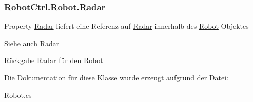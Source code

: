 \hypertarget{class_robot_ctrl_1_1_robot_adcc563b2531e72dcdfb9af5cafda1cbc}{
\subsubsection[{Radar}]{ RobotCtrl.Robot.Radar}}
\label{class_robot_ctrl_1_1_robot_adcc563b2531e72dcdfb9af5cafda1cbc}
Property \hyperlink{class_robot_ctrl_1_1_radar}{Radar} liefert eine Referenz auf \hyperlink{class_robot_ctrl_1_1_radar}{Radar} innerhalb des \hyperlink{class_robot_ctrl_1_1_robot}{Robot} Objektes \begin{DoxySeeAlso}{Siehe auch}
\hyperlink{class_robot_ctrl_1_1_radar}{Radar}
\end{DoxySeeAlso}
\begin{DoxyReturn}{Rückgabe}
\hyperlink{class_robot_ctrl_1_1_radar}{Radar} f\"{u}r den \hyperlink{class_robot_ctrl_1_1_robot}{Robot} 
\end{DoxyReturn}


Die Dokumentation für diese Klasse wurde erzeugt aufgrund der Datei:\begin{DoxyCompactItemize}
\item 
Robot.cs\end{DoxyCompactItemize}
